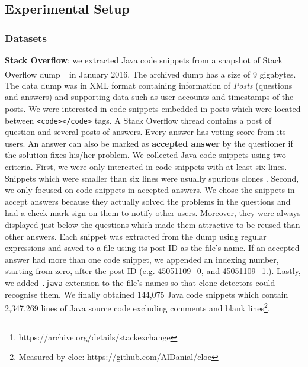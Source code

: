 \documentclass{sig-alternate-05-2015}
\begin{document}
\subsection{Experimental Setup}

\subsubsection{Datasets}

\textbf{Stack Overflow}: we extracted Java code snippets from a snapshot of Stack Overflow dump \footnote{https://archive.org/details/stackexchange} in January 2016. The archived dump has a size of 9 gigabytes. The data dump was in XML format containing information of \textit{Posts} (questions and answers) and supporting data such as user accounts and timestamps of the posts. We were interested in code snippets embedded in posts which were located between \texttt{<code></code>} tags. A Stack Overflow thread contains a post of question and several posts of answers. Every answer has voting score from its users. An answer can also be marked as \textbf{accepted answer} by the questioner if the solution fixes his/her problem. We collected Java code snippets using two criteria. First, we were only interested in code snippets with at least six lines. Snippets which were smaller than six lines were usually spurious clones \cite{Bellon2007}. Second, we only focused on code snippets in accepted answers. We chose the snippets in accept answers because they actually solved the problems in the questions and had a check mark sign on them to notify other users. Moreover, they were always displayed just below the questions which made them attractive to be reused than other answers. Each snippet was extracted from the dump using regular expressions and saved to a file using its post ID as the file's name. If an accepted answer had more than one code snippet, we appended an indexing number, starting from zero, after the post ID (e.g. 45051109\_0, and 45051109\_1.). Lastly, we added \texttt{.java} extension to the file's names so that clone detectors could recognise them. We finally obtained 144,075 Java code snippets which contain 2,347,269 lines of Java source code excluding comments and blank lines\footnote{Measured by cloc: https://github.com/AlDanial/cloc}.
\end{document}
